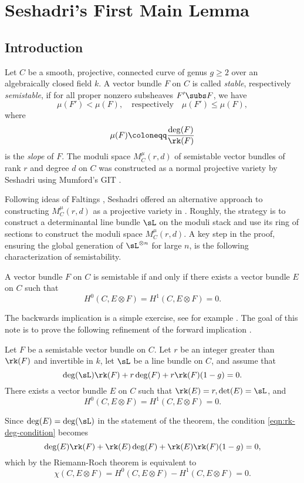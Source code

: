 \chapter{Seshadri's First Main Lemma}\label{chapter:seshadri}

\section{Introduction}
Let $C$ be a smooth, projective, connected curve of genus $g \ge 2$ over an algebraically closed field $k$. A vector bundle $F$ on $C$ is called \textit{stable}, respectively \textit{semistable}, if for all proper nonzero subsheaves $F' \subs F$, we have
\[ \mu(F') < \mu(F), \quad \text{respectively} \quad \mu(F') \leq \mu(F), \]
where 
\[ \mu(F) \coloneqq \frac{\deg(F)}{\rk(F)} \]
is the \textit{slope} of $F$. The moduli space $M^{\mu}_C(r,d)$ of semistable vector bundles of rank $r$ and degree $d$ on $C$ was constructed as a normal projective variety by Seshadri \cite{seshadri-space-of-unitary} using Mumford's GIT \cite{GIT}. 

Following ideas of Faltings \cite{faltings}, Seshadri offered an alternative approach to constructing $M^{\mu}_C(r,d)$ as a projective variety in \cite{seshadri}. Roughly, the strategy is to construct a determinantal line bundle $\sL$ on the moduli stack and use its ring of sections to construct the moduli space $M^{\mu}_C(r,d)$. A key step in the proof, ensuring the global generation of $\sL^{\otimes n}$ for large $n$, is the following characterization of semistability.
\begin{thm}
    A vector bundle $F$ on $C$ is semistable if and only if there exists a vector bundle $E$ on $C$ such that
    \[ H^0(C, E \otimes F) = H^1(C, E \otimes F) = 0. \]
\end{thm}
The backwards implication is a simple exercise, see for example \cite[Theorem 2.13]{MS}. The goal of this note is to prove the following refinement of the forward implication \cite[Lemma 3.1 ("First Main Lemma")]{seshadri}.

\begin{thm}\label{mainlemma1}
    Let $F$ be a semistable vector bundle on $C$. Let $r$ be an integer greater than $\rk(F)$ and invertible in $k$, let $\sL$ be a line bundle on $C$, and assume that
    \begin{equation}\label{eqn:rk-deg-condition}
        \deg(\sL) \rk(F) + r \deg(F) + r \rk(F) (1-g) = 0.
    \end{equation}
    There exists a vector bundle $E$ on $C$ such that $\rk(E) = r, \det(E) = \sL$, and 
    \[ H^0(C, E \otimes F) = H^1(C, E \otimes F) = 0. \]
\end{thm}
\begin{rmk}
    Since $\deg(E) = \deg(\sL)$ in the statement of the theorem, the condition \eqref{eqn:rk-deg-condition} becomes
    \[ \deg(E) \rk(F) + \rk(E) \deg(F) + \rk(E) \rk(F) (1-g) = 0, \]
    which by the Riemann-Roch theorem is equivalent to
    \[ \chi(C, E \otimes F) = H^0(C, E \otimes F) - H^1(C, E \otimes F) = 0. \]
\end{rmk}

